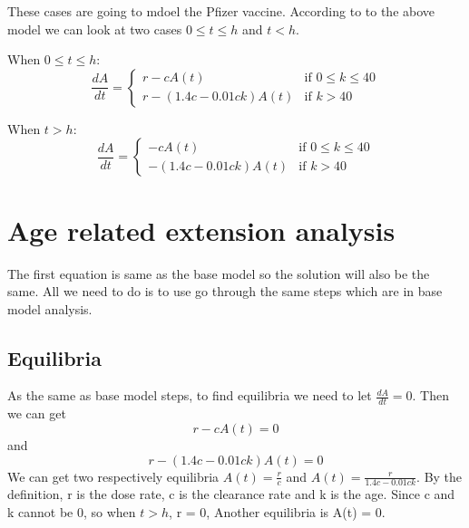\documentclass{article}
\begin{document}
These cases are going to mdoel the Pfizer vaccine. According to to the above model we can look at two cases $0 \leq t \leq h$ and $t < h$.

When $0 \leq t \leq h$:
\begin{equation}
  \frac{dA}{dt} =
    \begin{cases}
      r-cA(t) & \text{if  $0 \leq k \leq 40$}\\
      r- (1.4c-0.01ck)A(t) & \text{if $k > 40$}
    \end{cases}       
\end{equation}

When $t > h$:
\begin{equation}
  \frac{dA}{dt} =
    \begin{cases}
      -cA(t) & \text{if  $0 \leq k \leq 40$}\\
      -(1.4c-0.01ck)A(t) & \text{if $k > 40$}
    \end{cases}       
\end{equation}

\section*{Age related extension analysis}
The first equation is same as the base model so the solution will also be the same. All we need to do is to use go through the same steps which are in base model analysis. 

\subsection*{Equilibria}
As the same as base model steps, to find equilibria we need to let $\frac{dA}{dt} = 0$. Then we can get $$r-cA(t)=0$$ and $$r-(1.4c-0.01ck)A(t)=0$$ We can get two respectively equilibria $A(t)=\frac{r}{c}$ and $A(t)=\frac{r}{1.4c-0.01ck}$. By the definition, r is the dose rate, c is the clearance rate and k is the age. Since c and k cannot be 0, so when $t>h$, r = 0, Another equilibria is A(t) = 0.\\
\\
\end{document}

